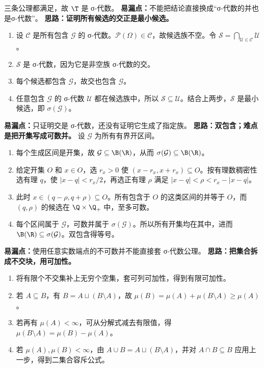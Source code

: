 三条公理都满足，故 $\T$ 是 σ-代数。
\textbf{易漏点：}不能把结论直接换成“σ-代数的并也是σ-代数”。
\textbf{思路：证明所有候选的交正是最小候选。}
\begin{enumerate}
\item 设 $\mathcal C$ 是所有包含 $\mathcal G$ 的 σ-代数。$\mathcal P(\Omega)\in\mathcal C$，故候选族不空。令 $\mathcal S=\bigcap_{\mathcal U\in\mathcal C}\mathcal U$。
\item $\mathcal S$ 是 σ-代数，因为它是非空族 σ-代数的交。
\item 每个候选都包含 $\mathcal G$，故交也包含 $\mathcal G$。
\item 任意包含 $\mathcal G$ 的 σ-代数 $\mathcal U$ 都在候选族中，所以 $\mathcal S\subseteq\mathcal U$。结合上两步，$\mathcal S$ 是最小候选，即 $\sigma(\mathcal G)$。
\end{enumerate}
\textbf{易漏点：}只证明交是 σ-代数，还没有证明它生成了指定族。
\textbf{思路：双包含；难点是把开集写成可数并。}
设 $\mathcal G$ 为所有有界开区间。
\begin{enumerate}
\item 每个生成区间是开集，故 $\mathcal G\subseteq\B(\R)$，从而 $\sigma(\mathcal G)\subseteq\B(\R)$。
\item 给定开集 $O$ 和 $x\in O$，选 $r_x>0$ 使 $(x-r_x,x+r_x)\subseteq O$。按有理数稠密性选有理 $q$，使 $|x-q|<r_x/2$，再选正有理 $\rho$ 满足 $|x-q|<\rho<r_x-|x-q|$。
\item 此时 $x\in(q-\rho,q+\rho)\subseteq O$。所有包含于 $O$ 的这类区间的并等于 $O$，而 $(q,\rho)$ 的候选在 $\Q\times\Q_+$ 中，至多可数。
\item 每个区间属于 $\mathcal G$，可数并属于 $\sigma(\mathcal G)$。所以所有开集均在其中，进而 $\B(\R)\subseteq\sigma(\mathcal G)$。双包含得等号。
\end{enumerate}
\textbf{易漏点：}使用任意实数端点的不可数并不能直接套 σ-代数公理。
\textbf{思路：把集合拆成不交块，用可加性。}
\begin{enumerate}
\item 将有限个不交集补上无穷个空集，套可列可加性，得到有限可加性。
\item 若 $A\subseteq B$，有 $B=A\sqcup(B\setminus A)$，故 $\mu(B)=\mu(A)+\mu(B\setminus A)\ge\mu(A)$。
\item 若再有 $\mu(A)<\infty$，可从分解式减去有限值，得 $\mu(B\setminus A)=\mu(B)-\mu(A)$。
\item 若 $\mu(A),\mu(B)<\infty$，由 $A\cup B=A\sqcup(B\setminus A)$，并对 $A\cap B\subseteq B$ 应用上一步，得到二集合容斥公式。
\end{enumerate}
